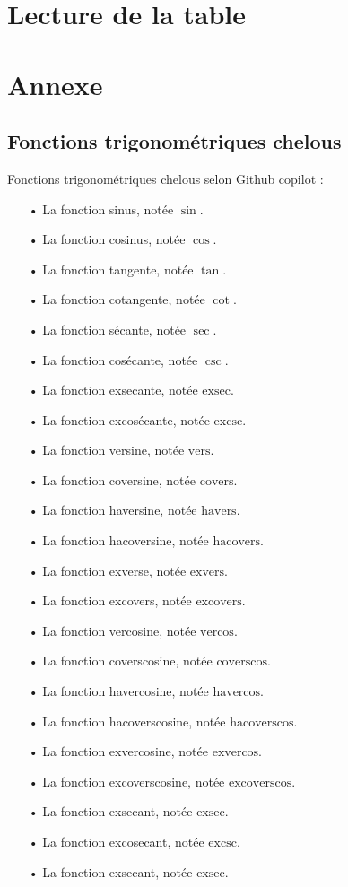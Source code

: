 \documentclass[a4paper]{article}
\begin{document}
\newpage

	\section{Lecture de la table}

\newpage

	\section{Annexe}

		\subsection*{Fonctions trigonométriques chelous} \label{fonction_trigo_chelous}

		Fonctions trigonométriques chelous selon Github copilot :

		\begin{itemize}
				\item [•] La fonction sinus, notée $\sin$.
				\item [•] La fonction cosinus, notée $\cos$.
				\item [•] La fonction tangente, notée $\tan$.
				\item [•] La fonction cotangente, notée $\cot$.
				\item [•] La fonction sécante, notée $\sec$.
				\item [•] La fonction cosécante, notée $\csc$.
				\item [•] La fonction exsecante, notée $\text{exsec}$.
				\item [•] La fonction excosécante, notée $\text{excsc}$.
				\item [•] La fonction versine, notée $\text{vers}$.
				\item [•] La fonction coversine, notée $\text{covers}$.
				\item [•] La fonction haversine, notée $\text{havers}$.
				\item [•] La fonction hacoversine, notée $\text{hacovers}$.
				\item [•] La fonction exverse, notée $\text{exvers}$.
				\item [•] La fonction excovers, notée $\text{excovers}$.
				\item [•] La fonction vercosine, notée $\text{vercos}$.
				\item [•] La fonction coverscosine, notée $\text{coverscos}$.
				\item [•] La fonction havercosine, notée $\text{havercos}$.
				\item [•] La fonction hacoverscosine, notée $\text{hacoverscos}$.
				\item [•] La fonction exvercosine, notée $\text{exvercos}$.
				\item [•] La fonction excoverscosine, notée $\text{excoverscos}$.
				\item [•] La fonction exsecant, notée $\text{exsec}$.
				\item [•] La fonction excosecant, notée $\text{excsc}$.
				\item [•] La fonction exsecant, notée $\text{exsec}$.
			\end{itemize}
\end{document}
